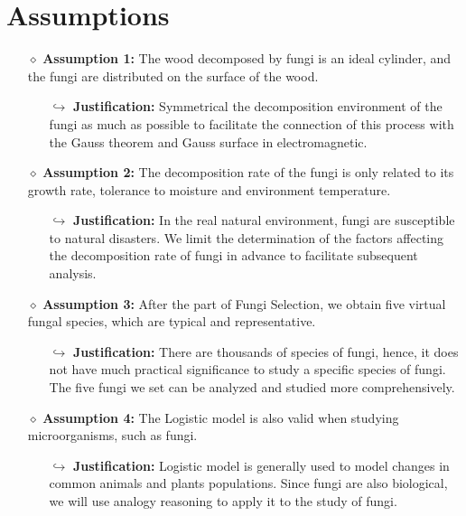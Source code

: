 \section{Assumptions}
\begin{itemize}
  \item[$\diamond$] \textbf{Assumption 1:} The wood decomposed by fungi is an ideal cylinder, and the fungi are distributed on the surface of the wood.
        \begin{itemize}
          \item[$\hookrightarrow$] \textbf{Justification:} Symmetrical the decomposition environment of the fungi as much as possible to facilitate the connection of this process with the Gauss theorem and Gauss surface in electromagnetic.
        \end{itemize}
  \item[$\diamond$] \textbf{Assumption 2:} The decomposition rate of the fungi is only related to its growth rate, tolerance to moisture and environment temperature.
        \begin{itemize}
          \item[$\hookrightarrow$] \textbf{Justification:} In the real natural environment, fungi are susceptible to natural disasters. We limit the determination of the factors affecting the decomposition rate of fungi in advance to facilitate subsequent analysis.
        \end{itemize}
  \item[$\diamond$] \textbf{Assumption 3:} After the part of Fungi Selection, we obtain five virtual fungal species, which are typical and representative.
        \begin{itemize}
          \item[$\hookrightarrow$] \textbf{Justification:} There are thousands of species of fungi, hence, it does not have much practical significance to study a specific species of fungi. The five fungi we set can be analyzed and studied more comprehensively.
        \end{itemize}
  \item[$\diamond$] \textbf{Assumption 4:} The Logistic model is also valid when studying microorganisms, such as fungi.
        \begin{itemize}
          \item[$\hookrightarrow$] \textbf{Justification:} Logistic model is generally used to model changes in common animals and plants populations. Since fungi are also biological, we will use analogy reasoning to apply it to the study of fungi.

\end{itemize}
\end{itemize}
